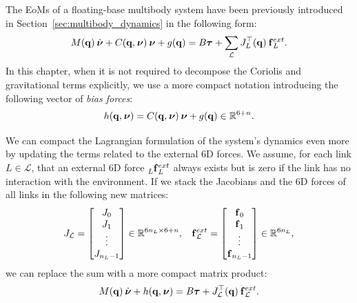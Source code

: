 The \acp{EoM} of a floating-base multibody system have been previously introduced in Section~\ref{sec:multibody_dynamics} in the following form:
%
\begin{equation*}
    M(\Qu) \Nud + C(\Qu, \Nu) \Nu + g(\Qu) = B \Torques + \sum_{\mathcal{L}} J_{L}^\top(\Qu) \forcesix_L^{ext}
    .
\end{equation*}
%
In this chapter, when it is not required to decompose the Coriolis and gravitational terms explicitly, we use a more compact notation introducing the following vector of \emph{bias forces}:
%
\begin{equation*}
    h(\Qu, \Nu) = C(\Qu, \Nu) \Nu + g(\Qu) \in \realn^{6+n}
    .
\end{equation*}

We can compact the Lagrangian formulation of the system's dynamics even more by updating the terms related to the external 6D forces.
We assume, for each link $L \in \mathcal{L}$, that an external 6D force $\forcesix[L]^{ext}_L$ always exists but is zero if the link has no interaction with the environment.
If we stack the Jacobians and the 6D forces of all links in the following new matrices:
%
\begin{align*}
    J_\mathcal{L} = 
    \begin{bmatrix}
        J_0 \\
        J_1 \\
        \vdots \\
        J_{n_L - 1}
    \end{bmatrix} \in \mathbb{R}^{6 n_L \times 6+n},
    && 
    \forcesix^{ext}_\mathcal{L} = 
    \begin{bmatrix}
        \forcesix_0 \\
        \forcesix_1 \\
        \vdots \\
        \forcesix_{n_L - 1}
    \end{bmatrix} \in \mathbb{R}^{6 n_L}
    ,
\end{align*}
%
we can replace the sum with a more compact matrix product:
%
\begin{equation}
    \label{eq:eom_multibody_compact}
    M(\Qu) \Nud + h(\Qu, \Nu) = B \Torques + J_\mathcal{L}^\top(\Qu) \forcesix^{ext}_\mathcal{L}
    .
\end{equation}

